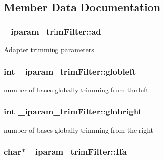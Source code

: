 \subsection{Member Data Documentation}
\hypertarget{struct__iparam__trimFilter_aba4b2762da9029d272905c558986b3f7}{
\subsubsection[{ad}]{ \+\_\+iparam\+\_\+trim\+Filter\+::ad}}\label{struct__iparam__trimFilter_aba4b2762da9029d272905c558986b3f7}
Adapter trimming parameters \hypertarget{struct__iparam__trimFilter_a2e626c5776d4423d20d5ec7606fe9b81}{
\subsubsection[{globleft}]{\setlength{\rightskip}{0pt plus 5cm}int \+\_\+iparam\+\_\+trim\+Filter\+::globleft}}\label{struct__iparam__trimFilter_a2e626c5776d4423d20d5ec7606fe9b81}
number of bases globally trimming from the left \hypertarget{struct__iparam__trimFilter_ad5fb4ca1786b14cd63a8467187474f51}{
\subsubsection[{globright}]{\setlength{\rightskip}{0pt plus 5cm}int \+\_\+iparam\+\_\+trim\+Filter\+::globright}}\label{struct__iparam__trimFilter_ad5fb4ca1786b14cd63a8467187474f51}
number of bases globally trimming from the right \hypertarget{struct__iparam__trimFilter_a55796cd412ef4ca61a5a799d2f64beec}{
\subsubsection[{Ifa}]{\setlength{\rightskip}{0pt plus 5cm}char$\ast$ \+\_\+iparam\+\_\+trim\+Filter\+::\+Ifa}}\label{struct__iparam__trimFilter_a55796cd412ef4ca61a5a799d2f64beec}
